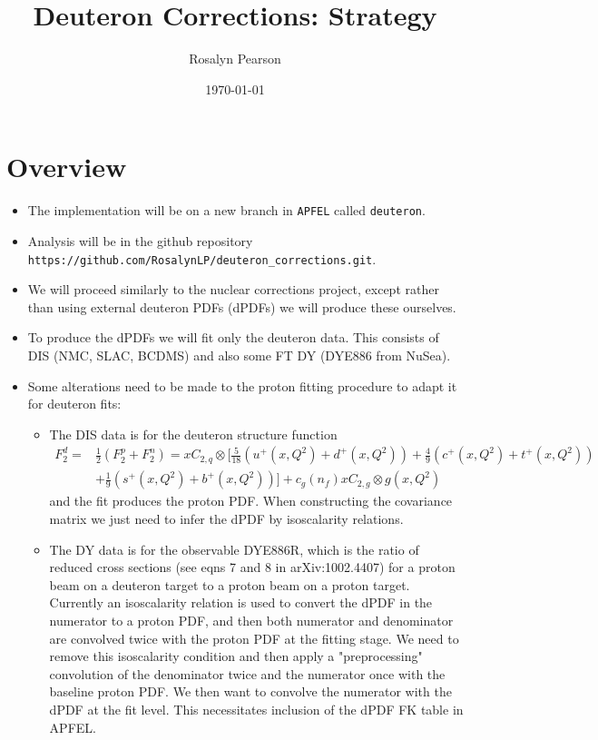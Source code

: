 \documentclass[a4paper,12pt]{article}
\title{\textbf{Deuteron Corrections: Strategy}}
\author{Rosalyn Pearson}
\date{\normalsize\today}
\begin{document}
\maketitle
\section{Overview}
\begin{itemize}
\item The implementation will be on a new branch in \texttt{APFEL} called \texttt{deuteron}.
\item Analysis will be in the github repository \newline \texttt{https://github.com/RosalynLP/deuteron\_corrections.git}.
\item We will proceed similarly to the nuclear corrections project, except rather than using external deuteron PDFs (dPDFs) we will produce these ourselves.
\item To produce the dPDFs we will fit only the deuteron data. This consists of DIS (NMC, SLAC, BCDMS) and also some FT DY (DYE886 from NuSea).
\item Some alterations need to be made to the proton fitting procedure to adapt it for deuteron fits:
\begin{itemize}
    \item The DIS data is for the deuteron structure function 
    \begin{equation}
    \begin{split}
        F_2^d = &\frac{1}{2}(F_2^p + F_2^n) = xC_{2,q} \otimes \bigg[ \frac{5}{18}(u^+(x,Q^2)+d^+(x,Q^2)) + \frac{4}{9}(c^+(x,Q^2) + t^+(x,Q^2)) 
        \\ &+ \frac{1}{9}(s^+(x,Q^2) + b^+(x,Q^2))\bigg] + c_g(n_f)xC_{2,g}\otimes g(x,Q^2)
    \end{split}
    \end{equation}
    and the fit produces the proton PDF. When constructing the covariance matrix we just need to infer the dPDF by isoscalarity relations.
    \item The DY data is for the observable DYE886R, which is the ratio of reduced cross sections (see eqns 7 and 8 in arXiv:1002.4407) for a proton beam on a deuteron target to a proton beam on a proton target. Currently an isoscalarity relation is used to convert the dPDF in the numerator to a proton PDF, and then both numerator and denominator are convolved twice with the proton PDF at the fitting stage. We need to remove this isoscalarity condition and then apply a "preprocessing" convolution of the denominator twice and the numerator once with the baseline proton PDF. We then want to convolve the numerator with the dPDF at the fit level. This necessitates inclusion of the dPDF FK table in APFEL. 
\end{itemize}
\end{itemize}
\end{document}
